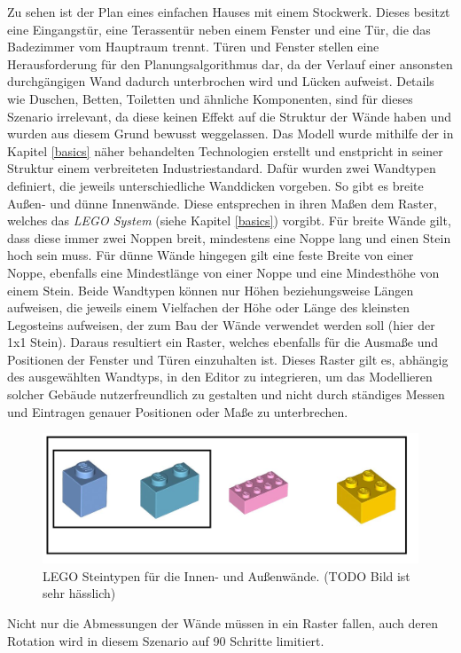Zu sehen ist der Plan eines einfachen Hauses mit einem Stockwerk.
Dieses besitzt eine Eingangstür, eine Terassentür neben einem Fenster und eine Tür, die das Badezimmer vom Hauptraum trennt.
Türen und Fenster stellen eine Herausforderung für den Planungsalgorithmus dar, da der Verlauf einer ansonsten durchgängigen Wand dadurch unterbrochen wird und Lücken aufweist.
Details wie Duschen, Betten, Toiletten und ähnliche Komponenten, sind für dieses Szenario irrelevant, da diese keinen Effekt auf die Struktur der Wände haben und wurden aus diesem Grund bewusst weggelassen.
Das Modell wurde mithilfe der in Kapitel \ref{basics} näher behandelten Technologien erstellt und enstpricht in seiner Struktur einem verbreiteten Industriestandard.
Dafür wurden zwei Wandtypen definiert, die jeweils unterschiedliche Wanddicken vorgeben.
So gibt es breite Außen- und dünne Innenwände.
Diese entsprechen in ihren Maßen dem Raster, welches das \textit{LEGO System} (siehe Kapitel \ref{basics}) vorgibt.
Für breite Wände gilt, dass diese immer zwei Noppen breit, mindestens eine Noppe lang und einen Stein hoch sein muss.
Für dünne Wände hingegen gilt eine feste Breite von einer Noppe, ebenfalls eine Mindestlänge von einer Noppe und eine Mindesthöhe von einem Stein.
Beide Wandtypen können nur Höhen beziehungsweise Längen aufweisen, die jeweils einem Vielfachen der Höhe oder Länge des kleinsten Legosteins aufweisen, der zum Bau der Wände verwendet werden soll (hier der 1x1 Stein).
Daraus resultiert ein Raster, welches ebenfalls für die Ausmaße und Positionen der Fenster und Türen einzuhalten ist.
Dieses Raster gilt es, abhängig des ausgewählten Wandtyps, in den Editor zu integrieren, um das Modellieren solcher Gebäude nutzerfreundlich zu gestalten und nicht durch ständiges Messen und Eintragen genauer Positionen oder Maße zu unterbrechen.
\begin{figure}[!ht]
    \centering
    \includegraphics[width=0.6\columnwidth]{fig/scenario1_lego_set.png}
    \caption{LEGO Steintypen für die Innen- und Außenwände. (TODO Bild ist sehr hässlich)}
    \label{fig:Scenario1 Lego Set}
\end{figure}
Nicht nur die Abmessungen der Wände müssen in ein Raster fallen, auch deren Rotation wird in diesem Szenario auf 90\textdegree{} Schritte limitiert. 
